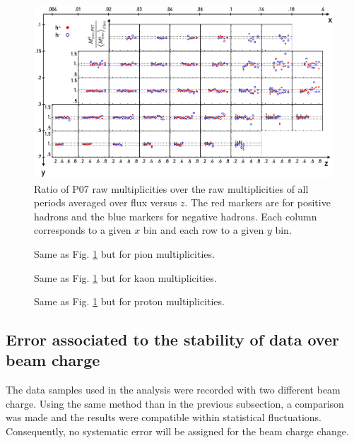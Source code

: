 \begin{figure}[!h]
  \centering
	\includegraphics[scale=0.85]{./gfx/SysTimeMult.png}
	\caption{Ratio of P07 raw multiplicities over the raw multiplicities of all periods averaged over flux versus $z$. The red markers are for positive hadrons and the blue markers for negative hadrons. Each column corresponds to a given $x$ bin and each row to a given $y$ bin.}
	\label{pic:hMultTime}
\end{figure}

\begin{figure}[!h]
  \centering
	\caption{Same as Fig. \ref{pic:hMultTime} but for pion multiplicities.}
	\label{pic:piMultTime}
\end{figure}

\begin{figure}[!h]
  \centering
	\caption{Same as Fig. \ref{pic:hMultTime} but for kaon multiplicities.}
	\label{pic:kMultTime}
\end{figure}

\begin{figure}[!h]
  \centering
	\caption{Same as Fig. \ref{pic:hMultTime} but for proton multiplicities.}
	\label{pic:pMultTime}
\end{figure}


\subsection{Error associated to the stability of data over beam charge}

The data samples used in the analysis were recorded with two different beam charge. Using the same method than in the previous subsection, a comparison was made and the results were compatible within statistical fluctuations. Consequently, no systematic error will be assigned for the beam charge change.

